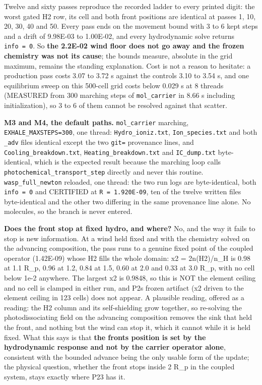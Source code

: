 \documentclass[english,a4paper]{my_memo}
\begin{document}
Twelve and sixty passes reproduce the recorded ladder to every printed digit:
the worst gated H2 row, its cell and both front positions are identical at
passes 1, 10, 20, 30, 40 and 50. Every pass ends on the movement bound with 3 to
6 kept steps and a drift of 9.98E-03 to 1.00E-02, and every hydrodynamic solve
returns \texttt{info\ =\ 0}. So \textbf{the 2.2E-02 wind floor does not go away and the frozen
chemistry was not its cause}; the bound\textquotesingle s measure, absolute in the grid
maximum, remains the standing explanation. Cost is not a reason to hesitate: a
production pass costs 3.07 to 3.72 s against the control\textquotesingle s 3.10 to 3.54 s, and
one equilibrium sweep on this 500-cell grid costs below 0.029 s at 8 threads
(MEASURED from 300 marching steps of \texttt{mol\_carrier} in 8.66 s including
initialization), so 3 to 6 of them cannot be resolved against that scatter.

\textbf{M3 and M4, the default paths.} \texttt{mol\_carrier} marching, \texttt{EXHALE\_MAXSTEPS=300},
one thread: \texttt{Hydro\_ioniz.txt}, \texttt{Ion\_species.txt} and both \texttt{\_adv} files identical
except the two \texttt{git=} provenance lines, and \texttt{Cooling\_breakdown.txt},
\texttt{Heating\_breakdown.txt} and \texttt{IC\_dump.txt} byte-identical, which is the expected
result because the marching loop calls \texttt{photochemical\_transport\_step} directly
and never this routine. \texttt{wasp\_full\_newton} reloaded, one thread: the two run
logs are byte-identical, both \texttt{info\ =\ 0} and CERTIFIED at \texttt{\textbar{}\textbar{}R\textbar{}\textbar{}\ =\ 1.920E-09},
ten of the twelve written files byte-identical and the other two differing in
the same provenance line alone. No molecules, so the branch is never entered.

\textbf{Does the front stop at fixed hydro, and where?} No, and the way it fails to
stop is new information. At a wind held fixed and with the chemistry solved on
the advancing composition, the pass runs to a genuine fixed point of the coupled
operator (1.42E-09) whose H2 fills the whole domain: x2 = 2n(H2)/n\_H is 0.98 at
1.1 R\_p, 0.96 at 1.2, 0.84 at 1.5, 0.60 at 2.0 and 0.33 at 3.0 R\_p, with no cell
below 1e-2 anywhere. The largest x2 is 0.9848, so this is NOT the element
ceiling and no cell is clamped in either run, and P2\textquotesingle s frozen artifact (x2
driven to the element ceiling in 123 cells) does not appear. A plausible
reading, offered as a reading: the H2 column and its self-shielding grow
together, so re-solving the photodissociating field on the advancing composition
removes the sink that held the front, and nothing but the wind can stop it,
which it cannot while it is held fixed. What this says is that \textbf{the front\textquotesingle s
position is set by the hydrodynamic response and not by the carrier operator
alone}, consistent with the bounded advance being the only usable form of the
update; the physical question, whether the front stops inside 2 R\_p in the
coupled system, stays exactly where P23 has it.
\end{document}
